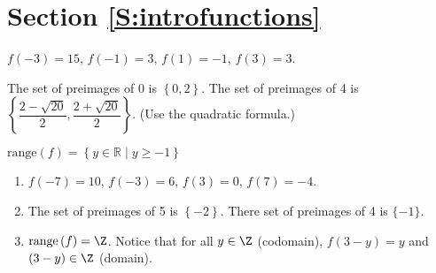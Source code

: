 \section*{Section \ref{S:introfunctions}}
\renewcommand{\labelenumi}{(\textbf{\alph{enumi}})}


\begin{list}{\bf{\ref{exer:sec61-2}.}}
\item \begin{list}{\bf{(a)}}
\item $f(-3) = 15$, $f(-1) = 3$, $f(1) = -1$, $f(3) = 3$.
\end{list}
\end{list}


\begin{list}{}
\item \begin{list}{\bf{(b)}}
\item The set of preimages of  0  is $\left\{ 0, 2 \right\}$. The set of preimages of 4  is  
$\left\{ \dfrac{{2 - \sqrt {20} }}{2}, \dfrac{{2 + \sqrt {20} }}{2} \right\}$.  (Use the quadratic formula.)
\end{list}
\end{list}
%
%
\begin{list}{}
\item \begin{list}{\bf{(d)}}
\item $\text{range} ( f ) = \left\{ y \in \mathbb{R} \mid y \geq  - 1 \right\}$
\end{list}
\end{list}


\begin{list}{\bf{\ref{exer61:integerfunction}.}}
\item \begin{enumerate}
\item 
$f \left( -7 \right) = 10$, 
$f \left( -3 \right) = 6$, 
$f \left( 3 \right) = 0$, 
$f \left( 7 \right) = -4$.

\item The set of preimages of  5 is  $\left\{ -2 \right\}$.  There set of preimages of 4 is $\{-1\}$.

\item $\text{range} \left( f \right) = \Z$.  Notice that for all $y \in \Z$ (codomain), $f(3 - y) = y$ and $(3 - y) \in \Z$ (domain).
\end{enumerate}
\end{list}


